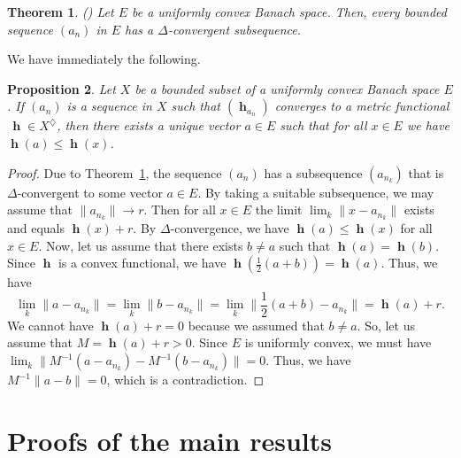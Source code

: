 \documentclass[a4paper,12pt]{article}
\newtheorem{theorem}{Theorem}[section]
\newtheorem{proposition}[theorem]{Proposition}
\theoremstyle{definition}
\numberwithin{equation}{section}
\newcommand{\norm}[1]{\lVert#1\rVert} %
\numberwithin{equation}{section}
\DeclareMathOperator{\h}{\mathbf{h}} %
\begin{document}
\begin{theorem}
\textup{(\cite[Theorem~4]{Lim1977})}
\label{BADelta}  
Let $E$ be a uniformly convex Banach space. 
Then, every bounded sequence $(a_n)$ in $E$ 
has a $\Delta$-convergent subsequence.
\end{theorem}

We have immediately the following.

\begin{proposition}  
Let $X$ be a bounded subset of a uniformly 
convex Banach space $E$. If $(a_n)$ 
is a sequence in $X$ such that 
$(\h_{a_n})$ converges to a metric functional
$\,\h\in X^\diamondsuit$, then 
there exists a unique vector $a\in E$ such that 
for all $x\in E$ we have $\h(a) \leq \h(x)$.
\end{proposition}

\begin{proof}
Due to Theorem~\ref{BADelta}, the sequence 
$(a_n)$ has a subsequence $(a_{n_k})$ that is 
$\Delta$-convergent to some vector $a\in E$.
By taking a suitable subsequence, we may 
assume that $\norm{a_{n_k}} \to r$. Then 
for all $x \in E$ the limit 
$\lim_{k} \norm{x - a_{n_k}}$ exists and 
equals $\h(x) + r$. By $\Delta$-convergence, 
we have $\h(a) \leq \h(x)$ for all $x\in E$.
Now, let us assume that there
exists $b\neq a$ such that $\h(a)=\h(b)$.
Since $\h$ is a convex functional, we have
$\h(\frac{1}{2}(a+b)) = \h(a)$.
Thus, we have 
$$
\lim_{k} \norm{a - a_{n_k}} 
    = \lim_{k} \norm{b - a_{n_k}}
    = \lim_{k} \norm{\frac{1}{2}(a+b) - a_{n_k}}
    = \h(a) + r.
$$
We cannot have $\h(a) + r = 0$ because
we assumed that $b\neq a$. So, let us assume 
that $M =\h(a) + r > 0$.
Since $E$ is uniformly convex, we must have
$\lim_k\norm{M^{-1}(a - a_{n_k}) - M^{-1}(b - a_{n_k})}=0$.
Thus, we have $M^{-1}\norm{a-b}=0$, 
which is a contradiction.
\end{proof} 

\section{Proofs of the main results}
\label{sec:proofs}
\end{document}
